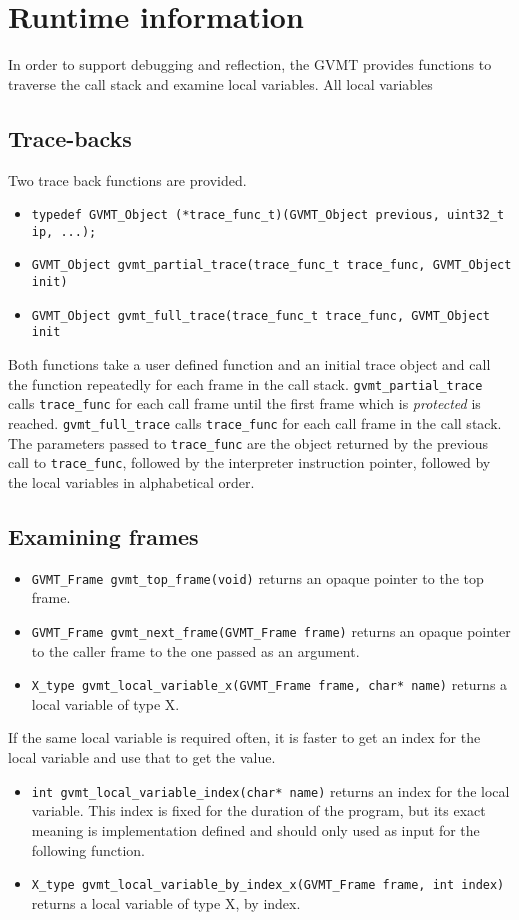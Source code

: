 \documentclass[a4paper,10pt]{article}
\begin{document}
\section{Runtime information}
In order to support debugging and reflection, the GVMT provides functions to traverse the call stack and examine local variables.
All local variables 

\subsection{Trace-backs}
Two trace back functions are provided.
\begin{itemize}
\item [] \verb|typedef GVMT_Object (*trace_func_t)(GVMT_Object previous, uint32_t ip, ...);|
\item [] \verb|GVMT_Object gvmt_partial_trace(trace_func_t trace_func, GVMT_Object init)|
\item [] \verb|GVMT_Object gvmt_full_trace(trace_func_t trace_func, GVMT_Object init|
\end{itemize}
Both functions take a user defined function and an initial trace object and call the function repeatedly for each frame in the call stack.
\verb|gvmt_partial_trace| calls \verb|trace_func| for each call frame until the first frame which is \emph{protected} is reached.
\verb|gvmt_full_trace| calls \verb|trace_func| for each call frame in the call stack.
The parameters passed to \verb|trace_func| are the object returned by the previous call to \verb|trace_func|, followed by the interpreter instruction pointer, followed by the local variables in alphabetical order.

\subsection{Examining frames}
\begin{itemize}
\item [] \verb|GVMT_Frame gvmt_top_frame(void)| returns an opaque pointer to the top frame.
\item []  \verb|GVMT_Frame gvmt_next_frame(GVMT_Frame frame)| returns an opaque pointer to the caller frame to the one passed as an argument.
\item []  \verb|X_type gvmt_local_variable_x(GVMT_Frame frame, char* name)| returns a local variable of type X.
\end{itemize}
If the same local variable is required often, it is faster to get an index for the local variable and use that to get the value.
\begin{itemize}
\item []  \verb|int gvmt_local_variable_index(char* name)| returns an index for the local variable. This index is fixed for the duration of the program, but its exact meaning is implementation defined and should only used as input for the following function.
\item []  \verb|X_type gvmt_local_variable_by_index_x(GVMT_Frame frame, int index)| returns a local variable of type X, by index.
\end{itemize}
\end{document}
